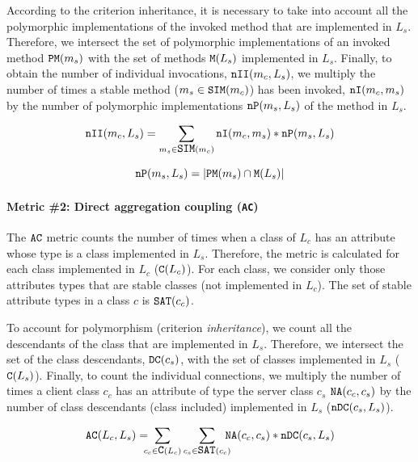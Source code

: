 According to the criterion inheritance, it is necessary to take into account all the polymorphic implementations of the invoked method that are implemented in $L_s$. Therefore, we intersect the set of polymorphic implementations of an invoked method $\verb|PM|(m_s)$ with the set of methods $\verb|M|(L_s)$ implemented in $L_s$. Finally, to obtain the number of individual invocations, $\verb|nII|(m_c,L_s)$, we multiply the number of times a stable method ($m_s \in \verb|SIM|(m_c)$) has been invoked, $\verb|nI|(m_c, m_s)$ by the number of polymorphic implementations $\verb|nP|(m_s, L_s)$ of the method in $L_s$.

\begin{equation}
\label{eqn:mic-nii}
   \verb|nII|(m_c, L_s) = \sum_{m_s \in \verb|SIM|(m_c)} \verb|nI|(m_c, m_s)*\verb|nP|(m_s, L_s)
\end{equation}

\begin{equation}
\label{eqn:mic-np}
    \verb|nP|(m_s, L_s) = |\verb|PM|(m_s) \cap \verb|M|(L_s)|
\end{equation}

\paragraph{Metric \#2: Direct aggregation coupling (\texttt{AC})}

The $\verb|AC|$ metric counts the number of times when a class of $L_c$ has an attribute whose type is a class implemented in $L_s$. Therefore, the metric is calculated for each class implemented in $L_c$ ($\verb|C|(L_c)$). For each class, we consider only those attributes types that are stable classes (not implemented in $L_c$). The set of stable attribute types in a class $c$ is $\verb|SAT|(c_c)$.

To account for polymorphism (criterion \textit{inheritance}), we count all the descendants of the class that are implemented in $L_s$. Therefore, we intersect the set of the class descendants, $\verb|DC|(c_s)$, with the set of
classes implemented in $L_s$ ($\verb|C|(L_s)$). Finally, to count the  individual connections, we multiply the number of times a client class $c_c$ has an attribute of type the server class $c_s$ $\verb|NA|(c_c, c_s)$ by the number of class descendants (class included) implemented in $L_s$ ($\verb|nDC|(c_s,L_s)$).

\begin{equation}
\label{eqn:ac}
  \verb|AC|(L_c,L_s) = \!\!\!\!\sum_{c_c \in \verb|C|(L_c)} \sum_{c_s \in \verb|SAT|(c_c)} \!\!\!\!\verb|NA|(c_c, c_s)*\verb|nDC|(c_s, L_s)
\end{equation}

